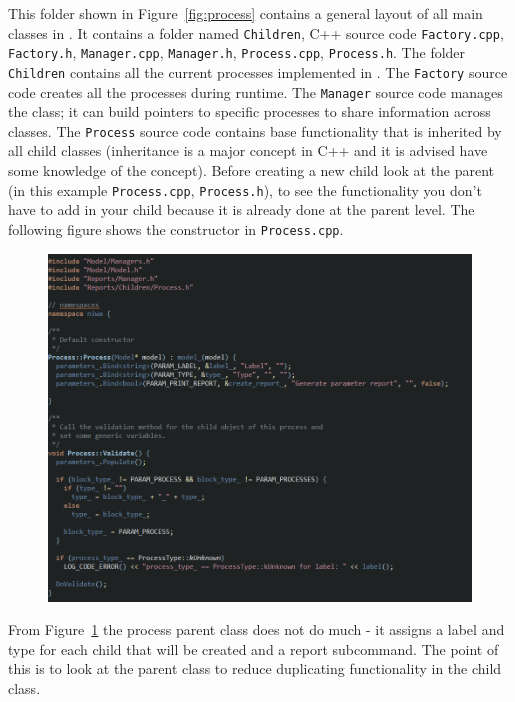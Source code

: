 This folder shown in Figure~\ref{fig:process} contains a general layout of all main classes in \CNAME. It contains a folder named \texttt{Children}, C++ source code \texttt{Factory.cpp}, \texttt{Factory.h}, \texttt{Manager.cpp}, \texttt{Manager.h}, \texttt{Process.cpp}, \texttt{Process.h}. The folder \texttt{Children} contains all the current processes implemented in \CNAME. The \texttt{Factory} source code creates all the processes during runtime. The \texttt{Manager} source code {\color{red}manages} the class{\color{red};} it can build pointers to specific processes to share information across classes. The \texttt{Process} source code contains base functionality that is inherited by all child classes (inheritance is a major concept in C++ and it is  advised have some knowledge of the concept). Before creating a new child look at the parent (in this example \texttt{Process.cpp}, \texttt{Process.h}), to see the functionality you don't have to add in your child because it is already done at the parent level. The following figure shows the constructor in \texttt{Process.cpp}.
\clearpage
\begin{figure}[!ht]
	\centering
	\includegraphics[scale=0.6]{Figures/add_survival1.png}
	\caption{}\label{fig:process1}
\end{figure}

From Figure~\ref{fig:process1} the process parent class does not do much {\color{red}-} it assigns a label and type for each child that will be created and a report subcommand. The point of this is to look at the parent class to reduce duplicating functionality in the child class.


